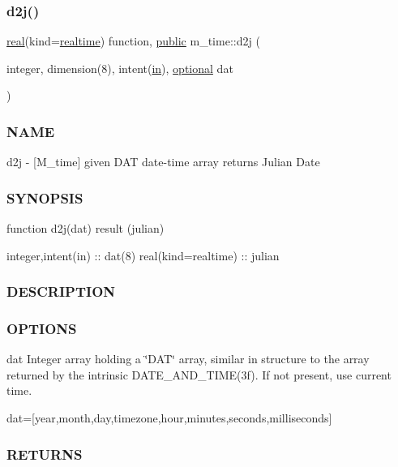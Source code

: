 \subsubsection{\texorpdfstring{d2j()}{d2j()}}
{\footnotesize\ttfamily \hyperlink{read__watch_83_8txt_abdb62bde002f38ef75f810d3a905a823}{real}(kind=\hyperlink{namespacem__time_ac10ea9e8d59ec74eaa7d89f2517d7422}{realtime}) function, \hyperlink{M__stopwatch_83_8txt_a2f74811300c361e53b430611a7d1769f}{public} m\+\_\+time\+::d2j (\begin{DoxyParamCaption}\item[{integer, dimension(8), intent(\hyperlink{M__journal_83_8txt_afce72651d1eed785a2132bee863b2f38}{in}), \hyperlink{option__stopwatch_83_8txt_aa4ece75e7acf58a4843f70fe18c3ade5}{optional}}]{dat }\end{DoxyParamCaption})}



\subsubsection*{N\+A\+ME}

d2j -\/ \mbox{[}M\+\_\+time\mbox{]} given D\+AT date-\/time array returns Julian Date 

\subsubsection*{S\+Y\+N\+O\+P\+S\+IS}

\begin{DoxyVerb}function d2j(dat) result (julian)

 integer,intent(in)  :: dat(8)
 real(kind=realtime) :: julian
\end{DoxyVerb}


\subsubsection*{D\+E\+S\+C\+R\+I\+P\+T\+I\+ON}

\subsubsection*{O\+P\+T\+I\+O\+NS}

dat Integer array holding a \char`\"{}\+D\+A\+T\char`\"{} array, similar in structure to the array returned by the intrinsic D\+A\+T\+E\+\_\+\+A\+N\+D\+\_\+\+T\+I\+M\+E(3f). If not present, use current time.

dat=\mbox{[}year,month,day,timezone,hour,minutes,seconds,milliseconds\mbox{]} \subsubsection*{R\+E\+T\+U\+R\+NS}

